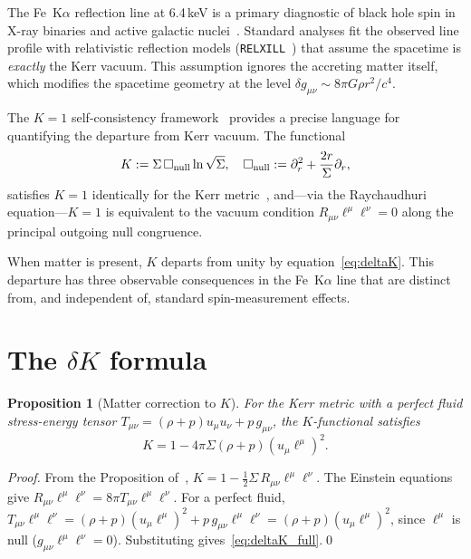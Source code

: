 \documentclass[12pt,a4paper]{article}
\newtheorem{proposition}[theorem]{Proposition}
\begin{document}
The Fe~K$\alpha$ reflection line at 6.4\,keV is a primary
diagnostic of black hole spin in X-ray binaries and active
galactic nuclei~\cite{Fabian2000,Reynolds2014}.
Standard analyses fit the observed line profile with
relativistic reflection models ({\tt RELXILL}~\cite{Garcia2014})
that assume the spacetime is \emph{exactly} the Kerr vacuum.
This assumption ignores the accreting matter itself, which
modifies the spacetime geometry at the level
$\delta g_{\mu\nu}\sim 8\pi G\rho r^2/c^4$.

The $K=1$ self-consistency framework~\cite{K1note} provides
a precise language for quantifying the departure from Kerr vacuum.
The functional
\begin{equation}
  K := \Sigma\,\Box_{\rm null}\ln\sqrt{\Sigma},\quad
  \Box_{\rm null} := \partial_r^2 + \frac{2r}{\Sigma}\partial_r,
\end{equation}
satisfies $K=1$ identically for the Kerr metric~\cite{K1note},
and---via the Raychaudhuri equation---$K=1$ is equivalent to
the vacuum condition $R_{\mu\nu}\ell^\mu\ell^\nu=0$ along the
principal outgoing null congruence.

When matter is present, $K$ departs from unity by
equation~\eqref{eq:deltaK}.
This departure has three observable consequences in the
Fe~K$\alpha$ line that are distinct from, and independent of,
standard spin-measurement effects.

\section{The $\delta K$ formula}\label{sec:deltaK}

\begin{proposition}[Matter correction to $K$]\label{prop:deltaK}
For the Kerr metric with a perfect fluid stress-energy tensor
$T_{\mu\nu}=(\rho+p)u_\mu u_\nu + p\,g_{\mu\nu}$,
the $K$-functional satisfies
\begin{equation}\label{eq:deltaK_full}
  K = 1 - 4\pi\Sigma(\rho+p)(u_\mu\ell^\mu)^2.
\end{equation}
\end{proposition}

\begin{proof}
From the Proposition of~\cite{K1note},
$K = 1 - \tfrac{1}{2}\Sigma\,R_{\mu\nu}\ell^\mu\ell^\nu$.
The Einstein equations give
$R_{\mu\nu}\ell^\mu\ell^\nu = 8\pi T_{\mu\nu}\ell^\mu\ell^\nu$.
For a perfect fluid,
$T_{\mu\nu}\ell^\mu\ell^\nu = (\rho+p)(u_\mu\ell^\mu)^2 + p\,g_{\mu\nu}\ell^\mu\ell^\nu
= (\rho+p)(u_\mu\ell^\mu)^2$,
since $\ell^\mu$ is null ($g_{\mu\nu}\ell^\mu\ell^\nu=0$).
Substituting gives~\eqref{eq:deltaK_full}.\qed
\end{proof}
\end{document}
